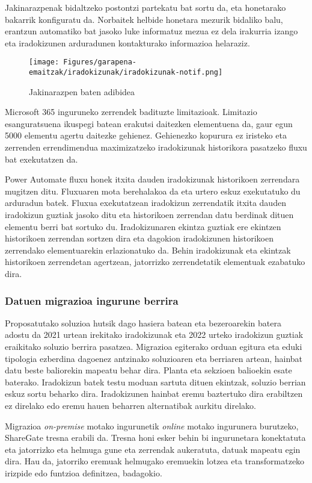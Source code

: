 Jakinarazpenak bidaltzeko postontzi partekatu bat sortu da, eta honetarako bakarrik konfiguratu da. Norbaitek helbide honetara mezurik bidaliko balu, erantzun automatiko bat jasoko luke informatuz mezua ez dela irakurria izango eta iradokizunen arduradunen kontakturako informazioa helaraziz. 

\begin{figure}[H]
\centering
\texttt{[image: Figures/garapena-emaitzak/iradokizunak/iradokizunak-notif.png]}
\caption{Jakinarazpen baten adibidea}
\label{img:iradokizun-jakinarazpen}
\end{figure}

Microsoft 365 inguruneko zerrendek badituzte limitazioak. Limitazio esanguratsuena ikuspegi batean erakutsi daitezken elementuena da, gaur egun 5000 elementu agertu daitezke gehienez. Gehienezko kopurura ez iristeko eta zerrenden errendimendua maximizatzeko iradokizunak historikora pasatzeko fluxu bat exekutatzen da.

Power Automate fluxu honek itxita dauden iradokizunak historikoen zerrendara mugitzen ditu.
Fluxuaren mota berehalakoa da eta urtero eskuz exekutatuko du arduradun batek.
Fluxua exekutatzean iradokizun zerrendatik itxita dauden iradokizun guztiak jasoko ditu eta historikoen zerrendan datu berdinak dituen elementu berri bat sortuko du. Iradokizunaren ekintza guztiak ere ekintzen historikoen zerrendan sortzen dira eta dagokion iradokizunen historikoen zerrendako elementuarekin erlazionatuko da.
Behin iradokizunak eta ekintzak historikoen zerrendetan agertzean, jatorrizko zerrendetatik elementuak ezabatuko dira.

\subsubsection{Datuen migrazioa ingurune berrira}\label{sec:iradokizun-migrazioa}
Proposatutako soluzioa hutsik dago hasiera batean eta bezeroarekin batera adostu da 2021 urtean irekitako iradokizunak eta 2022 urteko iradokizun guztiak eraikitako soluzio berrira pasatzea.
Migrazioa egiterako orduan egitura eta eduki tipologia ezberdina dagoenez antzinako soluzioaren eta berriaren artean, hainbat datu beste baliorekin mapeatu behar dira. Planta eta sekzioen balioekin esate baterako. Iradokizun batek testu moduan sartuta dituen ekintzak, soluzio berrian eskuz sortu beharko dira. Iradokizunen hainbat eremu baztertuko dira erabiltzen ez direlako edo eremu hauen beharren alternatibak aurkitu direlako.

Migrazioa \textit{on-premise} motako ingurunetik \textit{online} motako ingurunera burutzeko, ShareGate tresna erabili da.
Tresna honi esker behin bi ingurunetara konektatuta eta jatorrizko eta helmuga gune eta zerrendak aukeratuta, datuak mapeatu egin dira. Hau da, jatorriko eremuak helmugako eremuekin lotzea  eta transformatzeko irizpide edo funtzioa definitzea, badagokio.


